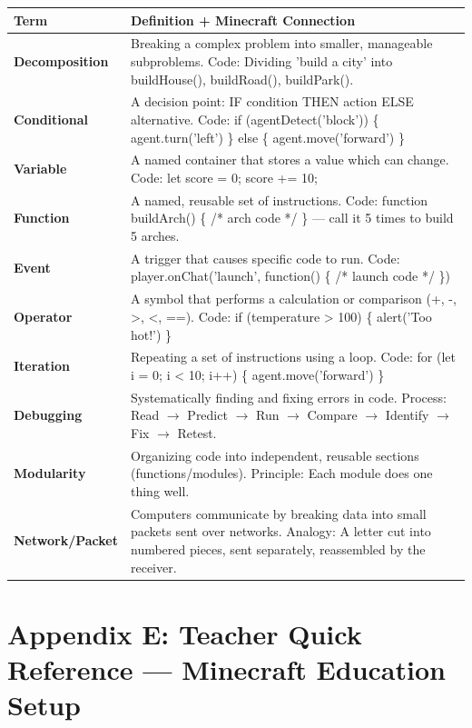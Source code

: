 \documentclass[11pt,letterpaper]{article}
\begin{document}
\begin{longtable}{|L{0.28\textwidth}|L{0.65\textwidth}|}
\hline
{}
\textbf{Term}  & \textbf{Definition + Minecraft Connection}  \\
\hline
\textbf{Decomposition}  & Breaking a complex problem into smaller, manageable subproblems. Code: Dividing 'build a city' into buildHouse(), buildRoad(), buildPark().  \\
\hline
\textbf{Conditional}  & A decision point: IF condition THEN action ELSE alternative. Code: if (agentDetect('block')) \{ agent.turn('left') \} else \{ agent.move('forward') \}  \\
\hline
\textbf{Variable}  & A named container that stores a value which can change. Code: let score = 0; score += 10;  \\
\hline
\textbf{Function}  & A named, reusable set of instructions. Code: function buildArch() \{ /* arch code */ \} --- call it 5 times to build 5 arches.  \\
\hline
\textbf{Event}  & A trigger that causes specific code to run. Code: player.onChat('launch', function() \{ /* launch code */ \})  \\
\hline
\textbf{Operator}  & A symbol that performs a calculation or comparison (+, -, >, <, ==). Code: if (temperature > 100) \{ alert('Too hot!') \}  \\
\hline
\textbf{Iteration}  & Repeating a set of instructions using a loop. Code: for (let i = 0; i < 10; i++) \{ agent.move('forward') \}  \\
\hline
\textbf{Debugging}  & Systematically finding and fixing errors in code. Process: Read \ensuremath{\rightarrow} Predict \ensuremath{\rightarrow} Run \ensuremath{\rightarrow} Compare \ensuremath{\rightarrow} Identify \ensuremath{\rightarrow} Fix \ensuremath{\rightarrow} Retest.  \\
\hline
\textbf{Modularity}  & Organizing code into independent, reusable sections (functions/modules). Principle: Each module does one thing well.  \\
\hline
\textbf{Network/Packet}  & Computers communicate by breaking data into small packets sent over networks. Analogy: A letter cut into numbered pieces, sent separately, reassembled by the receiver.  \\
\hline
\end{longtable}

\newpage
\section{Appendix E: Teacher Quick Reference --- Minecraft Education Setup}
\label{sec:AppendixETeacherQuickReferenceMinecraftEducationSetup}
\end{document}
